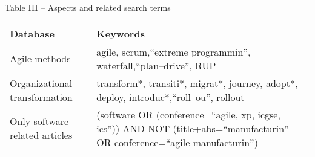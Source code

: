 \centering
Table III – Aspects and related search terms

\begin{tabular}{l p{30em}}
    \bfseries{Database} & \bfseries{Keywords} \\
    \hline
    Agile methods & agile, scrum,``extreme programmin'', waterfall,``plan–drive'', RUP \\
    Organizational transformation & transform*, transiti*, migrat*, journey, adopt*, deploy, introduc*,``roll–ou'', rollout \\
    Only software related articles & (software OR (conference=``agile, xp, icgse, ics'')) AND NOT (title+abs=``manufacturin'' OR conference=``agile manufacturin'') \\
    \hline
\end{tabular}

\justify
